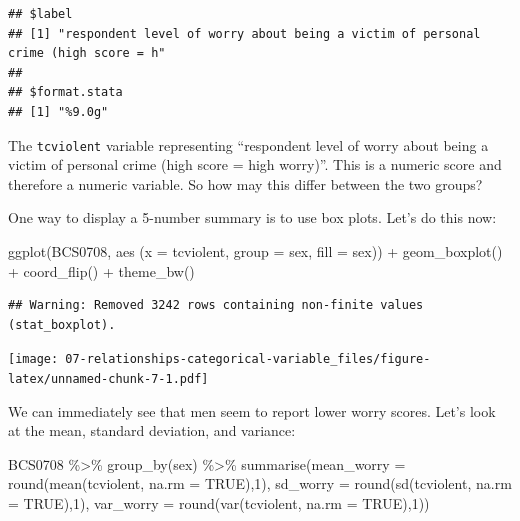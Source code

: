 \documentclass[
]{book}
\newenvironment{Shaded}{\begin{snugshade}}{\end{snugshade}}
\newcommand{\AttributeTok}[1]{\textcolor[rgb]{0.77,0.63,0.00}{#1}}
\newcommand{\ConstantTok}[1]{\textcolor[rgb]{0.00,0.00,0.00}{#1}}
\newcommand{\DecValTok}[1]{\textcolor[rgb]{0.00,0.00,0.81}{#1}}
\newcommand{\FunctionTok}[1]{\textcolor[rgb]{0.00,0.00,0.00}{#1}}
\newcommand{\NormalTok}[1]{#1}
\newcommand{\SpecialCharTok}[1]{\textcolor[rgb]{0.00,0.00,0.00}{#1}}
\begin{document}
\begin{verbatim}
## $label
## [1] "respondent level of worry about being a victim of personal crime (high score = h"
## 
## $format.stata
## [1] "%9.0g"
\end{verbatim}

The \texttt{tcviolent} variable representing ``respondent level of worry about being a victim of personal crime (high score = high worry)''. This is a numeric score and therefore a numeric variable. So how may this differ between the two groups?

One way to display a 5-number summary is to use box plots. Let's do this now:

\begin{Shaded}
\begin{Highlighting}[]
\FunctionTok{ggplot}\NormalTok{(BCS0708, }\FunctionTok{aes}\NormalTok{ (}\AttributeTok{x =}\NormalTok{ tcviolent, }\AttributeTok{group =}\NormalTok{ sex, }\AttributeTok{fill =}\NormalTok{ sex)) }\SpecialCharTok{+} 
  \FunctionTok{geom\_boxplot}\NormalTok{() }\SpecialCharTok{+} 
  \FunctionTok{coord\_flip}\NormalTok{() }\SpecialCharTok{+} 
  \FunctionTok{theme\_bw}\NormalTok{() }
\end{Highlighting}
\end{Shaded}

\begin{verbatim}
## Warning: Removed 3242 rows containing non-finite values (stat_boxplot).
\end{verbatim}

\texttt{[image: 07-relationships-categorical-variable\_files/figure-latex/unnamed-chunk-7-1.pdf]}

We can immediately see that men seem to report lower worry scores. Let's look at the mean, standard deviation, and variance:

\begin{Shaded}
\begin{Highlighting}[]
\NormalTok{BCS0708 }\SpecialCharTok{\%\textgreater{}\%} \FunctionTok{group\_by}\NormalTok{(sex) }\SpecialCharTok{\%\textgreater{}\%} 
  \FunctionTok{summarise}\NormalTok{(}\AttributeTok{mean\_worry =} \FunctionTok{round}\NormalTok{(}\FunctionTok{mean}\NormalTok{(tcviolent, }\AttributeTok{na.rm =} \ConstantTok{TRUE}\NormalTok{),}\DecValTok{1}\NormalTok{), }
            \AttributeTok{sd\_worry =} \FunctionTok{round}\NormalTok{(}\FunctionTok{sd}\NormalTok{(tcviolent, }\AttributeTok{na.rm =} \ConstantTok{TRUE}\NormalTok{),}\DecValTok{1}\NormalTok{), }
            \AttributeTok{var\_worry =} \FunctionTok{round}\NormalTok{(}\FunctionTok{var}\NormalTok{(tcviolent, }\AttributeTok{na.rm =} \ConstantTok{TRUE}\NormalTok{),}\DecValTok{1}\NormalTok{))}
\end{Highlighting}
\end{Shaded}
\end{document}
